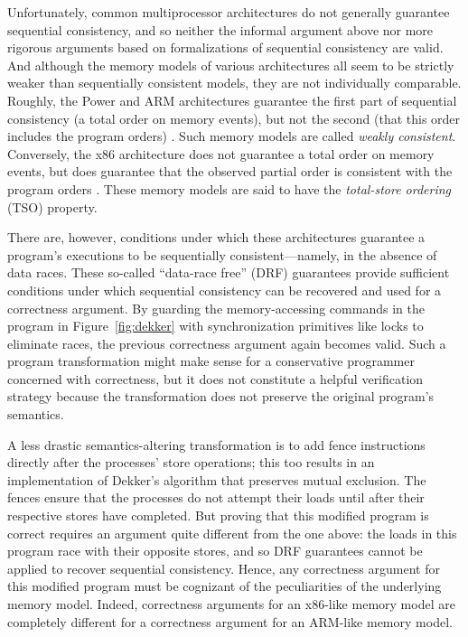\documentclass[11pt]{report}         %
\begin{document}
Unfortunately, common multiprocessor architectures do not generally guarantee sequential consistency, and so neither the informal argument above nor more rigorous arguments based on formalizations of sequential consistency are valid. And although the memory models of various architectures all seem to be strictly weaker than sequentially consistent models, they are not individually comparable. Roughly, the Power and ARM architectures guarantee the first part of sequential consistency (a total order on memory events), but not the second (that this order includes the program orders) \cite{DBLP:conf/popl/2009damp,DBLP:conf/asplos/ChongI08}. Such memory models are called \emph{weakly consistent}. Conversely, the x86 architecture does not guarantee a total order on memory events, but does guarantee that the observed partial order is consistent with the program orders \cite{DBLP:conf/tphol/OwensSS09}. These memory models are said to have the \emph{total-store ordering} (TSO) property.

There are, however, conditions under which these architectures guarantee a program's executions to be sequentially consistent---namely, in the absence of data races. These so-called ``data-race free'' (DRF) guarantees provide sufficient conditions under which sequential consistency can be recovered and used for a correctness argument. By guarding the memory-accessing commands in the program in Figure~\ref{fig:dekker} with synchronization primitives like locks to eliminate races, the previous correctness argument again becomes valid. Such a program transformation might make sense for a conservative programmer concerned with correctness, but it does not constitute a helpful verification strategy because the transformation does not preserve the original program's semantics.

A less drastic semantics-altering transformation is to add fence instructions directly after the processes' store operations; this too results in an implementation of Dekker's algorithm that preserves mutual exclusion. The fences ensure that the processes do not attempt their loads until after their respective stores have completed. But proving that this modified program is correct requires an argument quite different from the one above: the loads in this program race with their opposite stores, and so DRF guarantees cannot be applied to recover sequential consistency. Hence, any correctness argument for this modified program must be cognizant of the peculiarities of the underlying memory model. Indeed, correctness arguments for an x86-like memory model are completely different for a correctness argument for an ARM-like memory model.
\end{document}
